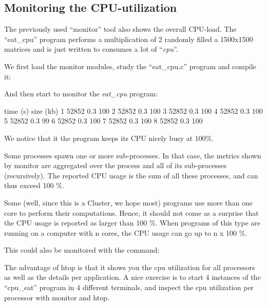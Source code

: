 \subsection{Monitoring the CPU-utilization}

The previously used ``monitor'' tool also shows the overall CPU-load. The
``eat\_cpu'' program performs a multiplication of 2 randomly filled a 1500x1500
matrices and is just written to consumes a lot of ``\emph{cpu}''.

We first load the monitor modules, study the ``eat\_cpu.c'' program and compile it:
\begin{prompt}
\end{prompt}

And then start to monitor the \emph{eat\_cpu} program:
\begin{prompt}
time  (s) size (kb) %
1  52852  0.3 100
2  52852  0.3 100
3  52852  0.3 100
4  52852  0.3 100
5  52852  0.3  99
6  52852  0.3 100
7  52852  0.3 100
8  52852  0.3 100
\end{prompt}

We notice that it the program keeps its CPU nicely busy at 100\%.

Some processes spawn one or more sub-processes. In that case, the metrics shown
by monitor are aggregated over the process and all of its sub-processes
(recursively). The reported CPU usage is the sum of all these processes, and
can thus exceed 100 \%.

Some (well, since this is a \hpc Cluster, we hope most) programs use more
than one core to perform their computations. Hence, it should not come as a
surprise that the CPU usage is reported as larger than 100 \%. When programs of
this type are running on a computer with n cores, the CPU usage can go up to n
x 100 \%.

This could also be monitored with the  command:
\begin{prompt}
\end{prompt}



The advantage of htop is that it shows you the cpu utilization for all
processors as well as the details per application.  A nice exercise is to start
4 instances of the ``cpu\_eat'' program in 4 different terminals, and inspect
the cpu utilization per processor with monitor and htop.

